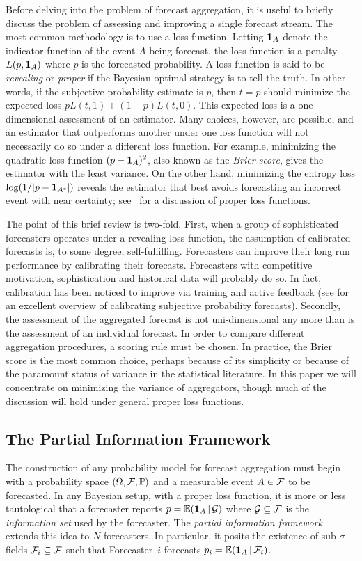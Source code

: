 \documentclass[11pt]{article}
\renewcommand{\P}{\mathbb{P}}
\newcommand{\E}{\mathbb{E}}
\theoremstyle{definition}
\theoremstyle{definition}
\def\one{{\bf 1}}
\def\F{{\cal F}}
\def\G{{\cal G}}
\def\P{{\mathbb P}}
\def\E{{\mathbb E}}
\def\|{\, | \,}
\begin{document}
Before delving into the problem of forecast aggregation, it is useful to briefly discuss the problem of assessing and improving a single
forecast stream.  The most common methodology is to use a loss
function.  Letting $\one_A$ denote the indicator function of the
event $A$ being forecast, the loss function is a penalty 
$L(p , \one_A)$ where $p$ is the forecasted probability.
A loss function is said to be {\em revealing} or {\em proper}
if the Bayesian optimal strategy is to tell the truth.  In other words, 
if the subjective probability estimate is $p$, then $t = p$ should
minimize the expected loss $p L(t,1) + (1-p) L(t,0)$.  This expected loss is a one dimensional
assessment of an estimator. Many
choices, however, are possible, and an estimator that outperforms 
another under one loss function will not necessarily do so
under a different loss function.  For example, minimizing the quadratic loss function
$(p - \one_A)^2$, also known as the {\em Brier score}, gives the estimator with the least variance. On the other hand, minimizing the entropy loss $\log (1 / |p - \one_{A^c}|)$ reveals the estimator that best avoids forecasting an incorrect event with near 
certainty; see~\citet[Section~2]{HwPe1997} for a discussion of
proper loss functions.

The point of this brief review is two-fold.  First, when a group of
sophisticated forecasters operates under a revealing loss function,
the assumption of calibrated forecasts is, to some degree, 
self-fulfilling.  Forecasters can improve their long run 
performance by calibrating their forecasts. Forecasters with 
competitive motivation, sophistication and historical data
will probably do so. In fact, calibration has been noticed to improve via training and active feedback (see \citealt{o2006uncertain} for an excellent overview of calibrating subjective probability forecasts). Secondly, the assessment of the aggregated forecast
is not uni-dimensional any more than is the assessment of an
individual forecast.  In order to compare different aggregation 
procedures, a scoring rule must be chosen.  In practice, the
Brier score is the most common choice, perhaps because of its simplicity
or because of the paramount status of variance in the statistical
literature.  In this paper we will concentrate on minimizing the
variance of aggregators, though much of the discussion will hold under
general proper loss functions.

\subsection{The Partial Information Framework}
\label{PIFintro}
The construction of any probability model for forecast aggregation must begin with a 
probability space $(\Omega, \F , \P)$ and a measurable event
$A \in \F$ to be forecasted.  In any Bayesian setup, with a proper 
loss function, it is more or less tautological that a forecaster
reports $p = \E (\one_A \| \G)$ where $\G \subseteq \F$ is the
\textit{information set} used by the forecaster.  The \textit{partial information framework} extends this idea to 
$N$ forecasters. In particular, it posits the existence
of sub-$\sigma$-fields $\F_i \subseteq \F$ such that Forecaster~$i$
forecasts $p_i = \E (\one_A \| \F_i)$. 
\end{document}
